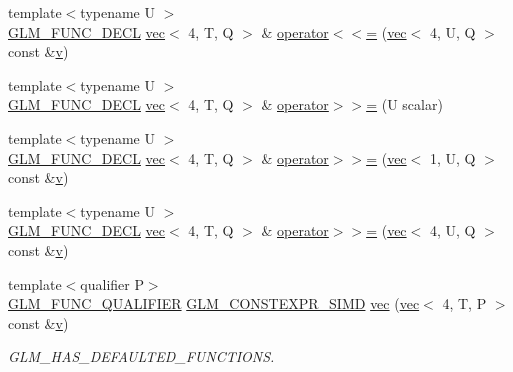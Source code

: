 \begin{DoxyCompactItemize}
\item 
{\footnotesize template$<$typename U $>$ }\\\hyperlink{setup_8hpp_ab2d052de21a70539923e9bcbf6e83a51}{G\+L\+M\+\_\+\+F\+U\+N\+C\+\_\+\+D\+E\+CL} \hyperlink{structglm_1_1vec}{vec}$<$ 4, T, Q $>$ \& \hyperlink{structglm_1_1vec_3_014_00_01_t_00_01_q_01_4_aee9c69807b9f783f5b6801f86fe153d7}{operator$<$$<$=} (\hyperlink{structglm_1_1vec}{vec}$<$ 4, U, Q $>$ const \&\hyperlink{_s_d_l__opengl_8h_a10a82eabcb59d2fcd74acee063775f90}{v})
\item 
{\footnotesize template$<$typename U $>$ }\\\hyperlink{setup_8hpp_ab2d052de21a70539923e9bcbf6e83a51}{G\+L\+M\+\_\+\+F\+U\+N\+C\+\_\+\+D\+E\+CL} \hyperlink{structglm_1_1vec}{vec}$<$ 4, T, Q $>$ \& \hyperlink{structglm_1_1vec_3_014_00_01_t_00_01_q_01_4_a28cea4bef361cb5dd994a3912fb1e00e}{operator$>$$>$=} (U scalar)
\item 
{\footnotesize template$<$typename U $>$ }\\\hyperlink{setup_8hpp_ab2d052de21a70539923e9bcbf6e83a51}{G\+L\+M\+\_\+\+F\+U\+N\+C\+\_\+\+D\+E\+CL} \hyperlink{structglm_1_1vec}{vec}$<$ 4, T, Q $>$ \& \hyperlink{structglm_1_1vec_3_014_00_01_t_00_01_q_01_4_ab04515a0b171b86148f9cf04edfde65f}{operator$>$$>$=} (\hyperlink{structglm_1_1vec}{vec}$<$ 1, U, Q $>$ const \&\hyperlink{_s_d_l__opengl_8h_a10a82eabcb59d2fcd74acee063775f90}{v})
\item 
{\footnotesize template$<$typename U $>$ }\\\hyperlink{setup_8hpp_ab2d052de21a70539923e9bcbf6e83a51}{G\+L\+M\+\_\+\+F\+U\+N\+C\+\_\+\+D\+E\+CL} \hyperlink{structglm_1_1vec}{vec}$<$ 4, T, Q $>$ \& \hyperlink{structglm_1_1vec_3_014_00_01_t_00_01_q_01_4_af1c26b9e068a4ea0fdd6dbb554d27100}{operator$>$$>$=} (\hyperlink{structglm_1_1vec}{vec}$<$ 4, U, Q $>$ const \&\hyperlink{_s_d_l__opengl_8h_a10a82eabcb59d2fcd74acee063775f90}{v})
\item 
{\footnotesize template$<$qualifier P$>$ }\\\hyperlink{setup_8hpp_a33fdea6f91c5f834105f7415e2a64407}{G\+L\+M\+\_\+\+F\+U\+N\+C\+\_\+\+Q\+U\+A\+L\+I\+F\+I\+ER} \hyperlink{setup_8hpp_ae5de828d10226b21e2123dd61f3cb5ed}{G\+L\+M\+\_\+\+C\+O\+N\+S\+T\+E\+X\+P\+R\+\_\+\+S\+I\+MD} \hyperlink{structglm_1_1vec_3_014_00_01_t_00_01_q_01_4_a29d7b0c6bd124719542646f92272f061}{vec} (\hyperlink{structglm_1_1vec}{vec}$<$ 4, T, P $>$ const \&\hyperlink{_s_d_l__opengl_8h_a10a82eabcb59d2fcd74acee063775f90}{v})
\begin{DoxyCompactList}\small\item\em G\+L\+M\+\_\+\+H\+A\+S\+\_\+\+D\+E\+F\+A\+U\+L\+T\+E\+D\+\_\+\+F\+U\+N\+C\+T\+I\+O\+NS. \end{DoxyCompactList}\item 

\end{DoxyCompactItemize}
